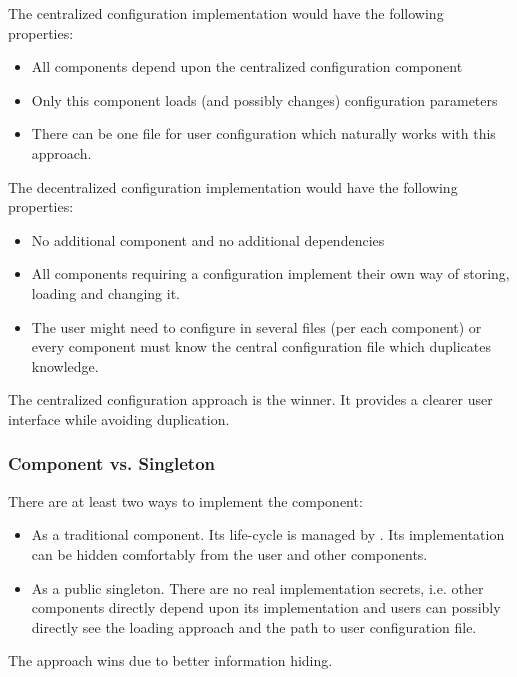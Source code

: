 The centralized configuration implementation would have the following properties:
\begin{itemize}
	\item All components depend upon the centralized configuration component
	\item Only this component loads (and possibly changes) configuration parameters
	\item There can be one file for user configuration which naturally works with this approach.
\end{itemize}

The decentralized configuration implementation would have the following properties:
\begin{itemize}
	\item No additional component and no additional dependencies
	\item All components requiring a configuration implement their own way of storing, loading and changing it.
	\item The user might need to configure in several files (per each component) or every component must know the central configuration file which duplicates knowledge.
\end{itemize}

The centralized configuration approach is the winner. It provides a clearer user interface while avoiding duplication.


\subsubsection{\ComponentRegistry{} Component vs. Singleton}
\label{sec:ImplementationConsiderations}

There are at least two ways to implement the \COMPconfiguration{} component:
\begin{itemize}
	\item As a traditional \ComponentRegistry{} component. Its life-cycle is managed by \ComponentRegistry{}. Its implementation can be hidden comfortably from the user and other components.
	\item As a public singleton. There are no real implementation secrets, i.e. other components directly depend upon its implementation and users can possibly directly see the loading approach and the path to user configuration file.
\end{itemize}

The \ComponentRegistry{} approach wins due to better information hiding.

%
%
